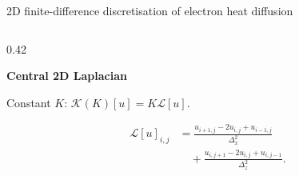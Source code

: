 \documentclass[aspectratio=169,10pt]{beamer}
\begin{document}
\begin{frame}[t]{2D finite-difference discretisation of electron heat diffusion}
\begin{columns}[T,totalwidth=0.99\textwidth]
\begin{column}{0.42\textwidth}
      \vspace{0.28cm}
      \begingroup
      \setlength{\fboxsep}{0.35em}
      \noindent\colorbox{GVTealTint}{%
        \begin{minipage}{\dimexpr\linewidth-2\fboxsep\relax}
          \scriptsize\textbf{\color{GVTeal}Central 2D Laplacian}
          {\scriptsize\color{GVSlate}\par Constant \(K\): \(\mathcal{K}(K)[u]=K\mathcal{L}[u]\).}
          \[
            \begin{aligned}
              \mathcal{L}[u]_{i,j}
              &=
              \frac{u_{i+1,j}-2u_{i,j}+u_{i-1,j}}{\Delta_x^2}\\[-0.06em]
              &\quad+
              \frac{u_{i,j+1}-2u_{i,j}+u_{i,j-1}}{\Delta_z^2}.
            \end{aligned}
          \]
        \end{minipage}}
      \endgroup
    \end{column}
  \end{columns}
\end{frame}
\end{document}
